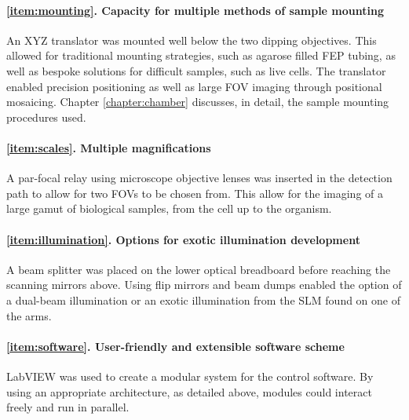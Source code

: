 \paragraph{\ref{item:mounting}. Capacity for multiple methods of sample mounting}
An XYZ translator was mounted well below the two dipping objectives.
This allowed for traditional mounting strategies, such as agarose filled \gls{FEP} tubing, as well as bespoke solutions for difficult samples, such as live cells.
The translator enabled precision positioning as well as large FOV imaging through positional mosaicing.
Chapter \ref{chapter:chamber} discusses, in detail, the sample mounting procedures used.

\paragraph{\ref{item:scales}. Multiple magnifications}
A par-focal relay using microscope objective lenses was inserted in the detection path to allow for two FOVs to be chosen from. This allow for the imaging of a large gamut of biological samples, from the cell up to the organism.

\paragraph{\ref{item:illumination}. Options for exotic illumination development}
A beam splitter was placed on the lower optical breadboard before reaching the scanning mirrors above. Using flip mirrors and beam dumps enabled the option of a dual-beam illumination or an exotic illumination from the SLM found on one of the arms.

\paragraph{\ref{item:software}. User-friendly and extensible software scheme}
\gls{LabVIEW} was used to create a modular system for the control software.
By using an appropriate architecture, as detailed above, modules could interact freely and run in parallel.

